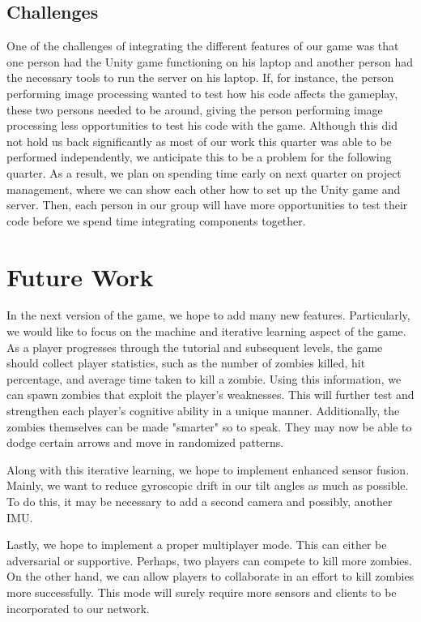 \documentclass[titlepage, 12pt]{scrartcl}
\begin{document}
    \subsection{Challenges}
    One of the challenges of integrating the different features of our game was that one person had the Unity game functioning on his laptop and another person had the necessary tools to run the server on his laptop. If, for instance, the person performing image processing wanted to test how his code affects the gameplay, these two persons needed to be around, giving the person performing image processing less opportunities to test his code with the game. Although this did not hold us back significantly as most of our work this quarter was able to be performed independently, we anticipate this to be a problem for the following quarter. As a result, we plan on spending time early on next quarter on project management, where we can show each other how to set up the Unity game and server. Then, each person in our group will have more opportunities to test their code before we spend time integrating components together.
    
\section{Future Work}
    In the next version of the game, we hope to add many new features. Particularly, we would like to focus on the machine and iterative learning aspect of the game. As a player progresses through the tutorial and subsequent levels, the game should collect player statistics, such as the number of zombies killed, hit percentage, and average time taken to kill a zombie. Using this information, we can spawn zombies that exploit the player's weaknesses. This will further test and strengthen each player's cognitive ability in a unique manner. Additionally, the zombies themselves can be made "smarter" so to speak. They may now be able to dodge certain arrows and move in randomized patterns. \par
    Along with this iterative learning, we hope to implement enhanced sensor fusion. Mainly, we want to reduce gyroscopic drift in our tilt angles as much as possible. To do this, it may be necessary to add a second camera and possibly, another IMU. \par
    Lastly, we hope to implement a proper multiplayer mode. This can either be adversarial or supportive. Perhaps, two players can compete to kill more zombies. On the other hand, we can allow players to collaborate in an effort to kill zombies more successfully. This mode will surely require more sensors and clients to be incorporated to our network.

\nocite{*}
\end{document}

